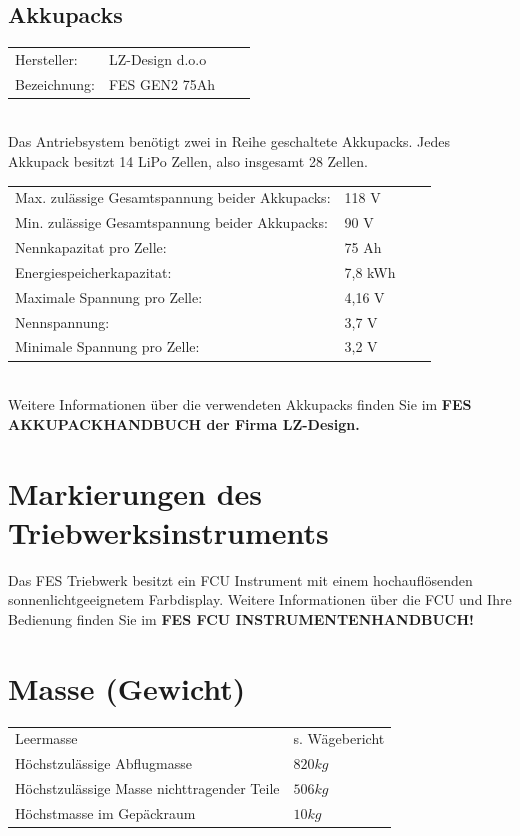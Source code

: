 \subsection{Akkupacks}
\begin{tabular}{p{}p{}ll}
Hersteller: & LZ-Design d.o.o \\
Bezeichnung:& FES GEN2 75Ah \\
\end{tabular}\\

\vspace{0.2cm}
Das Antriebsystem benötigt zwei in Reihe geschaltete Akkupacks. Jedes Akkupack besitzt 14 LiPo Zellen, also insgesamt 28 Zellen.\\

\begin{tabular}{p{}p{}ll}
Max. zulässige Gesamtspannung beider Akkupacks: & 118 V \\
Min. zulässige Gesamtspannung beider Akkupacks: & 90 V \\
Nennkapazitat pro Zelle: & 75 Ah \\
Energiespeicherkapazitat: & 7,8 kWh \\
Maximale Spannung pro Zelle: & 4,16 V \\
Nennspannung: & 3,7 V \\
Minimale Spannung pro Zelle: & 3,2 V \\
\end{tabular}\\

\vspace{0.5cm}
Weitere Informationen über die verwendeten Akkupacks finden Sie im \textbf{FES AKKUPACKHANDBUCH der Firma LZ-Design.}

\section{Markierungen des Triebwerksinstruments}
Das FES Triebwerk besitzt ein FCU Instrument mit einem hochauflösenden
sonnenlichtgeeignetem Farbdisplay. Weitere Informationen über die FCU und Ihre
Bedienung finden Sie im \textbf{FES FCU INSTRUMENTENHANDBUCH!}

\section{Masse (Gewicht)}
\begin{tabular}{l l}
Leermasse & s. Wägebericht\\
Höchstzulässige Abflugmasse & $820kg$\\
Höchstzulässige Masse nichttragender Teile & $506kg$ \\
Höchstmasse im Gepäckraum & $10kg$ \\
\end{tabular}\\

